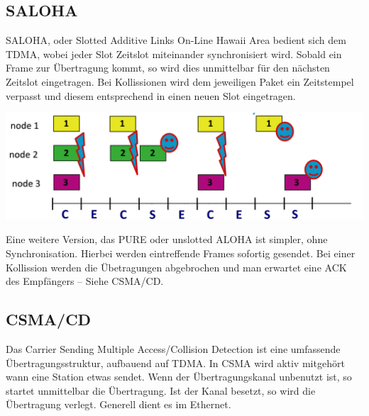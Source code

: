 \documentclass{scrartcl}
\begin{document}
    \subsection{SALOHA}
    SALOHA, oder Slotted Additive Links On-Line Hawaii Area bedient sich dem TDMA, wobei jeder Slot Zeitslot miteinander synchronisiert wird.
    Sobald ein Frame zur Übertragung kommt, so wird dies unmittelbar für den nächsten Zeitslot eingetragen. Bei Kollissionen wird dem jeweiligen Paket ein Zeitstempel verpasst und diesem entsprechend in einen neuen Slot eingetragen.
    \begin{center}
        \includegraphics[width=\textwidth]{Aloha.png}
    \end{center}
    
    Eine weitere Version, das PURE oder unslotted ALOHA ist simpler, ohne Synchronisation. Hierbei werden eintreffende Frames sofortig gesendet.
    Bei einer Kollission werden die Übetragungen abgebrochen und man erwartet eine ACK des Empfängers -- Siehe CSMA/CD.
    
    \subsection{CSMA/CD}
    Das Carrier Sending Multiple Access/Collision Detection ist eine umfassende Übertragungsstruktur, aufbauend auf TDMA.
    In CSMA wird aktiv mitgehört wann eine Station etwas sendet. Wenn der Übertragungskanal unbenutzt ist, so startet unmittelbar die Übertragung. Ist der Kanal besetzt, so wird die Übertragung verlegt. Generell dient es im Ethernet.
    
\end{document}
